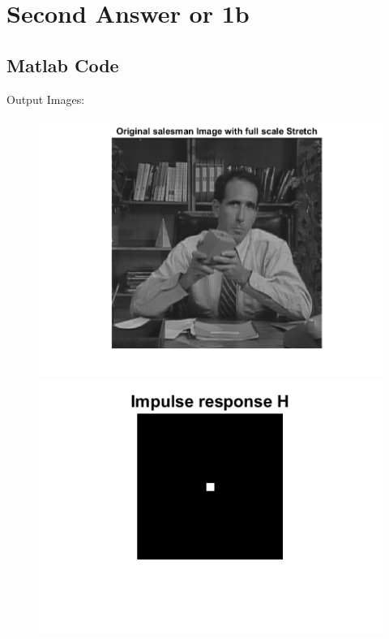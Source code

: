 \documentclass[11pt]{article} %
\begin{document}
\section {Second Answer or 1b}
\subsection*{Matlab Code}

Output Images: 
\begin{figure}
 \centering
	\includegraphics{1ba.png}
	\includegraphics{1bb.png}
\end{figure}
\end{document}
